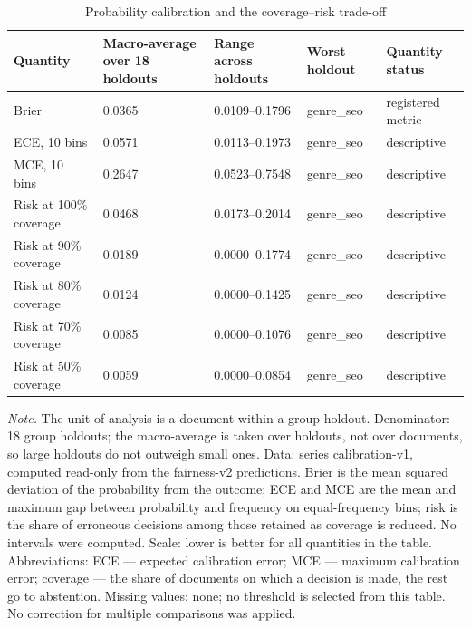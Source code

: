 \begin{table}[htbp]
\centering
\small
\caption{Probability calibration and the coverage–risk trade-off}
\label{tab:6}
\begin{tabular}{lllll}
\toprule
Quantity & Macro-average over 18 holdouts & Range across holdouts & Worst holdout & Quantity status \\
\midrule
Brier & 0.0365 & 0.0109–0.1796 & genre\_seo & registered metric \\
ECE, 10 bins & 0.0571 & 0.0113–0.1973 & genre\_seo & descriptive \\
MCE, 10 bins & 0.2647 & 0.0523–0.7548 & genre\_seo & descriptive \\
Risk at 100\% coverage & 0.0468 & 0.0173–0.2014 & genre\_seo & descriptive \\
Risk at 90\% coverage & 0.0189 & 0.0000–0.1774 & genre\_seo & descriptive \\
Risk at 80\% coverage & 0.0124 & 0.0000–0.1425 & genre\_seo & descriptive \\
Risk at 70\% coverage & 0.0085 & 0.0000–0.1076 & genre\_seo & descriptive \\
Risk at 50\% coverage & 0.0059 & 0.0000–0.0854 & genre\_seo & descriptive \\
\bottomrule
\end{tabular}
\begin{minipage}{\linewidth}\footnotesize\vspace{2pt}
\textit{Note.} The unit of analysis is a document within a group holdout. Denominator: 18 group holdouts; the macro-average is taken over holdouts, not over documents, so large holdouts do not outweigh small ones. Data: series calibration-v1, computed read-only from the fairness-v2 predictions. Brier is the mean squared deviation of the probability from the outcome; ECE and MCE are the mean and maximum gap between probability and frequency on equal-frequency bins; risk is the share of erroneous decisions among those retained as coverage is reduced. No intervals were computed. Scale: lower is better for all quantities in the table. Abbreviations: ECE — expected calibration error; MCE — maximum calibration error; coverage — the share of documents on which a decision is made, the rest go to abstention. Missing values: none; no threshold is selected from this table. No correction for multiple comparisons was applied.
\end{minipage}
\end{table}
